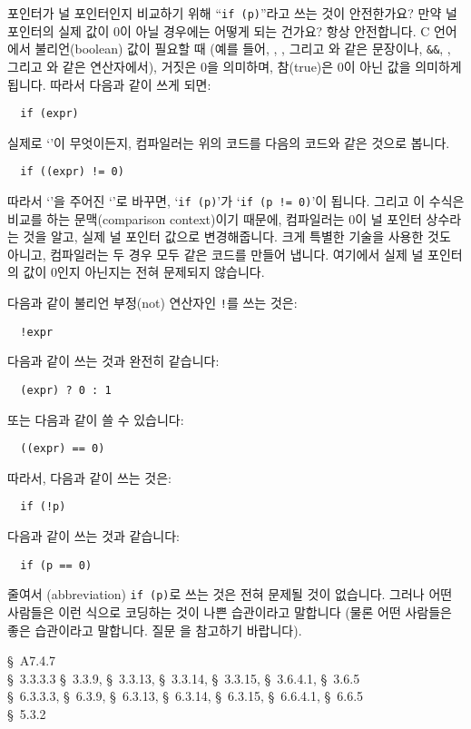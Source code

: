 \begin{faq}
	포인터가 널 포인터인지 비교하기 위해 ``\verb+if (p)+''라고 쓰는
	것이 안전한가요? 만약 널 포인터의 실제 값이 0이 아닐 경우에는
	어떻게 되는 건가요?
\A
	항상 안전합니다.
	C 언어에서 불리언(boolean) 값이 필요할 때 (예를 들어, ,
	,  그리고 와 같은 문장이나, \verb+&&+,
	\TT{||}, \TT{!} 그리고 와 같은 연산자에서), 거짓은 0을 의미하며,
	참(true)은 0이 아닌 값을 의미하게 됩니다.
	따라서 다음과 같이 쓰게 되면:
\begin{verbatim}
  if (expr)
\end{verbatim}
	\noindent 실제로 `'이 무엇이든지, 컴파일러는 위의 코드를
	다음의 코드와 같은 것으로 봅니다.
\begin{verbatim}
  if ((expr) != 0)
\end{verbatim}
	따라서 `'을 주어진 `'로 바꾸면,
	`\verb+if (p)+'가 `\verb+if (p != 0)+'이 됩니다.
	그리고 이 수식은 비교를 하는 문맥(comparison context)이기 때문에,
	컴파일러는 0이 널 포인터 상수라는 것을 알고, 실제 널 포인터
	값으로 변경해줍니다. 크게 특별한 기술을 사용한 것도 아니고,
	컴파일러는 두 경우 모두 같은 코드를 만들어 냅니다. 
	여기에서  실제 널 포인터의 값이 0인지 아닌지는 전혀 문제되지 않습니다.

	다음과 같이 불리언 부정(not) 연산자인 \verb+!+를 쓰는 것은:

\begin{verbatim}
  !expr
\end{verbatim}

	다음과 같이 쓰는 것과 완전히 같습니다:

\begin{verbatim}
  (expr) ? 0 : 1
\end{verbatim}

	또는 다음과 같이 쓸 수 있습니다:

\begin{verbatim}
  ((expr) == 0)
\end{verbatim}

	따라서, 다음과 같이 쓰는 것은:

\begin{verbatim}
  if (!p)
\end{verbatim}

	다음과 같이 쓰는 것과 같습니다:

\begin{verbatim}
  if (p == 0)
\end{verbatim}
	줄여서 (abbreviation) \verb+if (p)+로 쓰는 것은 전혀 문제될 것이
	없습니다.  그러나 어떤 사람들은 이런 식으로 코딩하는 것이 나쁜
	습관이라고 말합니다 (물론 어떤 사람들은 좋은 습관이라고 말합니다.
	질문 을 참고하기 바랍니다).


\R
	\cite{kr2} \S\ A7.4.7  \\
	\cite{ansi} \S\ 3.3.3.3 \S\ 3.3.9, \S\ 3.3.13, \S\ 3.3.14, \S\ 3.3.15,
	            \S\ 3.6.4.1, \S\ 3.6.5 \\
	\cite{c89} \S\ 6.3.3.3,	\S\ 6.3.9, \S\ 6.3.13, 
		\S\ 6.3.14, \S\ 6.3.15, \S\ 6.6.4.1, \S\ 6.6.5 \\
	\cite{hs} \S\ 5.3.2 
\end{faq}

